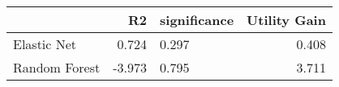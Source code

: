 \begin{tabular}{lrlr}
\toprule
{} &     R2 & significance &  Utility Gain \\
\midrule
Elastic Net   &  0.724 &       0.297  &         0.408 \\
Random Forest & -3.973 &       0.795  &         3.711 \\
\bottomrule
\end{tabular}
